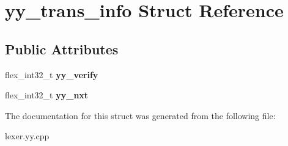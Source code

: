\hypertarget{structyy__trans__info}{}\section{yy\+\_\+trans\+\_\+info Struct Reference}
\label{structyy__trans__info}
\subsection*{Public Attributes}
\begin{DoxyCompactItemize}
\item 
\mbox{\label{structyy__trans__info_a5c9f61e770deef50bd4e697310342fe9}} 
flex\+\_\+int32\+\_\+t {\bfseries yy\+\_\+verify}
\item 
\mbox{\label{structyy__trans__info_ae0715250c2bef261e596e77e0030f13e}} 
flex\+\_\+int32\+\_\+t {\bfseries yy\+\_\+nxt}
\end{DoxyCompactItemize}


The documentation for this struct was generated from the following file\+:\begin{DoxyCompactItemize}
\item 
lexer.\+yy.\+cpp\end{DoxyCompactItemize}
